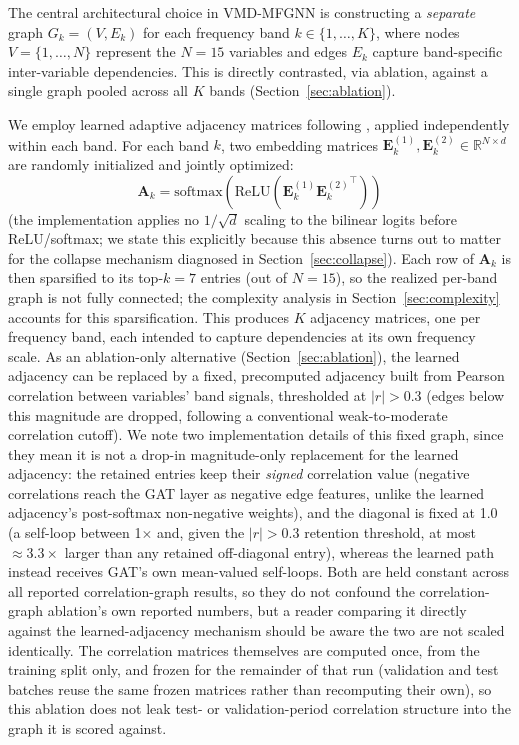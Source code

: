 \documentclass[journal]{IEEEtran}
\begin{document}
The central architectural choice in VMD-MFGNN is constructing a \emph{separate} graph $G_k = (V, E_k)$ for each frequency band $k \in \{1,\ldots,K\}$, where nodes $V = \{1, \ldots, N\}$ represent the $N=15$ variables and edges $E_k$ capture band-specific inter-variable dependencies. This is directly contrasted, via ablation, against a single graph pooled across all $K$ bands (Section~\ref{sec:ablation}).

We employ learned adaptive adjacency matrices following \citet{Wu2020mtgnn}, applied independently within each band. For each band $k$, two embedding matrices $\mathbf{E}^{(1)}_k, \mathbf{E}^{(2)}_k \in \mathbb{R}^{N \times d}$ are randomly initialized and jointly optimized:
\begin{equation}
\label{eq:graph}
\mathbf{A}_k = \text{softmax}\left(\text{ReLU}\left(\mathbf{E}^{(1)}_k {\mathbf{E}^{(2)}_k}^\top\right)\right)
\end{equation}
(the implementation applies no $1/\sqrt{d}$ scaling to the bilinear logits before ReLU/softmax; we state this explicitly because this absence turns out to matter for the collapse mechanism diagnosed in Section~\ref{sec:collapse}). Each row of $\mathbf{A}_k$ is then sparsified to its top-$k=7$ entries (out of $N=15$), so the realized per-band graph is not fully connected; the complexity analysis in Section~\ref{sec:complexity} accounts for this sparsification. This produces $K$ adjacency matrices, one per frequency band, each intended to capture dependencies at its own frequency scale. As an ablation-only alternative (Section~\ref{sec:ablation}), the learned adjacency can be replaced by a fixed, precomputed adjacency built from Pearson correlation between variables' band signals, thresholded at $|r| > 0.3$ (edges below this magnitude are dropped, following a conventional weak-to-moderate correlation cutoff). We note two implementation details of this fixed graph, since they mean it is not a drop-in magnitude-only replacement for the learned adjacency: the retained entries keep their \emph{signed} correlation value (negative correlations reach the GAT layer as negative edge features, unlike the learned adjacency's post-softmax non-negative weights), and the diagonal is fixed at 1.0 (a self-loop between 1$\times$ and, given the $|r|>0.3$ retention threshold, at most $\approx3.3\times$ larger than any retained off-diagonal entry), whereas the learned path instead receives GAT's own mean-valued self-loops. Both are held constant across all reported correlation-graph results, so they do not confound the correlation-graph ablation's own reported numbers, but a reader comparing it directly against the learned-adjacency mechanism should be aware the two are not scaled identically. The correlation matrices themselves are computed once, from the training split only, and frozen for the remainder of that run (validation and test batches reuse the same frozen matrices rather than recomputing their own), so this ablation does not leak test- or validation-period correlation structure into the graph it is scored against.
\end{document}
